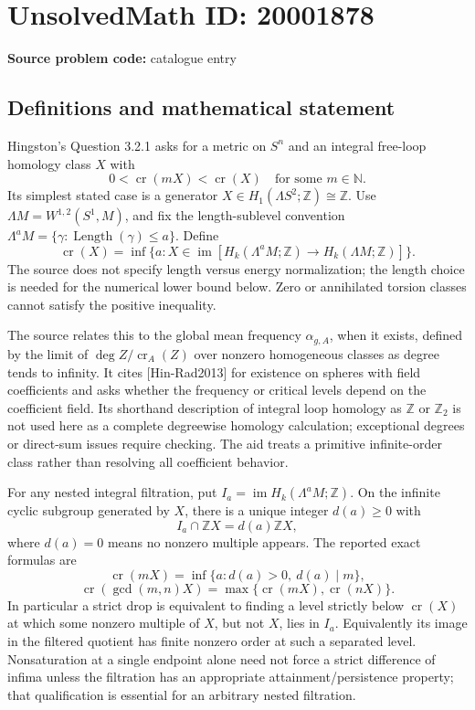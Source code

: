 \documentclass[11pt]{article}
\newcommand{\N}{\mathbb{N}}
\newcommand{\Z}{\mathbb{Z}}
\begin{document}
\section*{UnsolvedMath ID: 20001878}
\textbf{Source problem code:} catalogue entry
\subsection{Definitions and mathematical statement}
Hingston's Question 3.2.1 asks for a metric on \(S^n\) and an integral free-loop homology class \(X\) with
\[
 0<\operatorname{cr}(mX)<\operatorname{cr}(X)
 \quad\text{for some }m\in\N.
\]
Its simplest stated case is a generator \(X\in H_1(\Lambda S^2;\Z)\cong\Z\). Use \(\Lambda M=W^{1,2}(S^1,M)\), and fix the length-sublevel convention \(\Lambda^aM=\{\gamma:\operatorname{Length}(\gamma)\leq a\}\). Define
\[
 \operatorname{cr}(X)=\inf\{a:X\in\operatorname{im}[H_k(\Lambda^aM;\Z)\to H_k(\Lambda M;\Z)]\}.
\]
The source does not specify length versus energy normalization; the length choice is needed for the numerical lower bound below. Zero or annihilated torsion classes cannot satisfy the positive inequality.

The source relates this to the global mean frequency \(\alpha_{g,A}\), when it exists, defined by the limit of \(\deg Z/\operatorname{cr}_A(Z)\) over nonzero homogeneous classes as degree tends to infinity. It cites [Hin-Rad2013] for existence on spheres with field coefficients and asks whether the frequency or critical levels depend on the coefficient field. Its shorthand description of integral loop homology as \(\Z\) or \(\Z_2\) is not used here as a complete degreewise homology calculation; exceptional degrees or direct-sum issues require checking. The aid treats a primitive infinite-order class rather than resolving all coefficient behavior.

For any nested integral filtration, put \(I_a=\operatorname{im}H_k(\Lambda^aM;\Z)\). On the infinite cyclic subgroup generated by \(X\), there is a unique integer \(d(a)\geq0\) with
\[
 I_a\cap\Z X=d(a)\Z X,
\]
where \(d(a)=0\) means no nonzero multiple appears. The reported exact formulas are
\[
 \operatorname{cr}(mX)=\inf\{a:d(a)>0,\ d(a)\mid m\},
\]
\[
 \operatorname{cr}(\gcd(m,n)X)
 =\max\{\operatorname{cr}(mX),\operatorname{cr}(nX)\}.
\]
In particular a strict drop is equivalent to finding a level strictly below \(\operatorname{cr}(X)\) at which some nonzero multiple of \(X\), but not \(X\), lies in \(I_a\). Equivalently its image in the filtered quotient has finite nonzero order at such a separated level. Nonsaturation at a single endpoint alone need not force a strict difference of infima unless the filtration has an appropriate attainment/persistence property; that qualification is essential for an arbitrary nested filtration.
\end{document}
